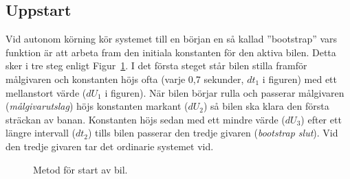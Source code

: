 \subsection{Uppstart} 
\label{sec:systembeskrivning:uppstart}


Vid autonom körning kör systemet till en början en så kallad ''bootstrap'' vars
funktion är att arbeta fram den initiala konstanten för den aktiva bilen. Detta
sker i tre steg enligt Figur~\ref{fig:bootstrap}. I det första steget står bilen
stilla framför målgivaren och konstanten höjs ofta (varje 0,7 sekunder, $dt_1$ i
figuren) med ett mellanstort värde ($dU_1$ i figuren). När bilen börjar rulla
och passerar målgivaren (\emph{målgivarutslag}) höjs konstanten markant ($dU_2$)
så bilen ska klara den första sträckan av banan. Konstanten höjs sedan med ett
mindre värde ($dU_3$) efter ett längre intervall ($dt_2$) tills bilen passerar
den tredje givaren (\emph{bootstrap slut}). Vid den tredje givaren tar det
ordinarie systemet vid.

\begin{figure}
	\centering
	\caption{Metod för start av bil.}
	\label{fig:bootstrap}
\end{figure}
